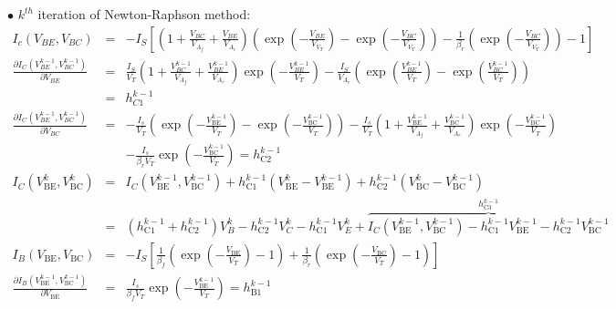 \documentclass{article}
\begin{document}
\noindent $\bullet$ $k^{th}$ iteration of Newton-Raphson method:
\newcommand{\Vfrac}[2]{\frac{V_{#1}}{V_{#2}}}
\newcommand{\Vkm}[1]{V^{k-1}_{#1}}
\newcommand{\IsV}[1]{\frac{I_S}{V_{#1}}}
\newcommand{\hb}[1]{h^{k-1}_{B#1}}
\newcommand{\hc}[1]{h^{k-1}_{C#1}}
\begin{eqnarray*}
  I_c(V_{BE},V_{BC}) & = & - I_S \left[\left(1+\Vfrac{BC}{A_f}+\Vfrac{BE}{A_r}\right)
	  \left(\exp\left(-\Vfrac{BE}{V_T}\right)-\exp\left(-\Vfrac{BC}{V_T}\right)\right) - 
	  \frac{1}{\beta_r}\left(\exp\left(-\Vfrac{BC}{V_T}\right)\right)-1 \right]\\
    \frac{\partial I_C(\Vkm{BE}, \Vkm{BC})}{\partial V_{BE}} & = & 
	  \IsV{T} \left(1 + \frac{\Vkm{BC}}{V_{A_f}} + \frac{\Vkm{BE}}{V_{A_r}}\right) 
	  \exp\left(-\frac{\Vkm{BE}}{V_T}\right) 
	  - \frac{I_S}{V_{A_r}} \left(\exp\left(\frac{\Vkm{BE}}{V_T}\right) - 
	  \exp\left(\frac{\Vkm{BC}}{V_T}\right)\right)\\
	  & = & \hc{1} \\
  \frac{\partial I_C(\Vkm{BE}, \Vkm{BC})}{\partial V_{BC}} & = & 
  -\frac{I_s}{V_T}\left(\exp \left(-\frac{V_{\text{BE}}^{k-1}}{V_T}\right)-\exp
  \left(-\frac{V_{\text{BC}}^{k-1}}{V_T}\right)\right)
  -\frac{I_s}{V_T}\left(1+\frac{V_{\text{BE}}^{k-1}}{V_{A_f}} + 
  \frac{V_{\text{BC}}^{k-1}}{V_{A_r}}\right)\exp
  \left(-\frac{V_{\text{BC}}^{k-1}}{V_T}\right)\\
  & & -\frac{I_s}{\beta _rV_T}\exp
  \left(-\frac{V_{\text{BC}}^{k-1}}{V_T}\right)=h_{\text{C2}}^{k-1} \\
  I_C\left(V_{\text{BE}}^k,V_{\text{BC}}^k\right) & = & 
  I_C\left(V_{\text{BE}}^{k-1},V_{\text{BC}}^{k-1}\right) + 
  h_{\text{C1}}^{k-1}\left(V_{\text{BE}}^k-V_{\text{BE}}^{k-1}\right) + 
  h_{\text{C2}}^{k-1}\left(V_{\text{BC}}^k-V_{\text{BC}}^{k-1}\right)\\
  & = & \left(h_{\text{C1}}^{k-1}+h_{\text{C2}}^{k-1}\right)V_B^k-h_{\text{C2}}^{k-1}V_C^k-h_{\text{C1}}^{k-1}V_E^k+\overbrace{I_C\left(V_{\text{BE}}^{k-1},V_{\text{BC}}^{k-1}\right)-h_{\text{C1}}^{k-1}V_{\text{BE}}^{k-1}-h_{\text{C2}}^{k-1}V_{\text{BC}}^{k-1}}^{h_{\text{C3}}^{k-1}}\\
  I_B\left(V_{\text{BE}},V_{\text{BC}}\right) & = & -I_S\left[\frac{1}{\beta _f}\left(\exp \left(-\frac{V_{\text{BE}}}{V_T}\right)-1\right)+\frac{1}{\beta _r}\left(\exp \left(-\frac{V_{\text{BC}}}{V_T}\right)-1\right)\right]\\
  \frac{\partial I_B\left(V_{\text{BE}}^{k-1},V_{\text{BC}}^{k-1}\right)}{\partial V_{\text{BE}}} & = &
  \frac{I_s}{\beta _fV_T}\exp \left(-\frac{V_{\text{BE}}^{k-1}}{V_T}\right)=h_{\text{B1}}^{k-1}\\

\end{eqnarray*}
\end{document}
